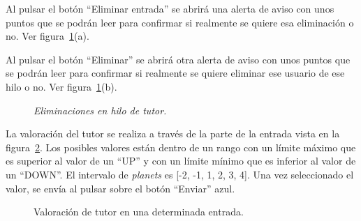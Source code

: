 \documentclass[a4paper, 12pt]{book}
\begin{document}
Al pulsar el bot\'on ``Eliminar entrada'' se abrir\'a una alerta de aviso con unos puntos que se podr\'an leer para confirmar si realmente se quiere esa 
eliminaci\'on o no. Ver figura~\ref{figura:hiloprofesor1}(a).

Al pulsar el bot\'on ``Eliminar'' se abrir\'a otra alerta de aviso con unos puntos que se podr\'an leer para confirmar si realmente se quiere eliminar ese
usuario de ese hilo o no. Ver figura~\ref{figura:hiloprofesor1}(b).
\begin{figure}
  \centering
  \caption{\textit{Eliminaciones en hilo de tutor.}}
  \label{figura:hiloprofesor1}
\end{figure}

La valoraci\'on del tutor se realiza a trav\'es de la parte de la entrada vista en la figura~\ref{figura:hiloprofesor2}. Los posibles valores est\'an dentro
de un rango con un l\'imite m\'aximo que es superior al valor de un ``UP'' y con un l\'imite m\'inimo que es inferior al valor de un ``DOWN''. El intervalo de
\textit{planets} es [-2, -1, 1, 2, 3, 4]. Una vez seleccionado el valor, se env\'ia al pulsar sobre el bot\'on ``Enviar'' azul.
\begin{figure}[htbp] 
  \centering
  \caption{Valoraci\'on de tutor en una determinada entrada.}
  \label{figura:hiloprofesor2}
\end{figure}
\end{document}

